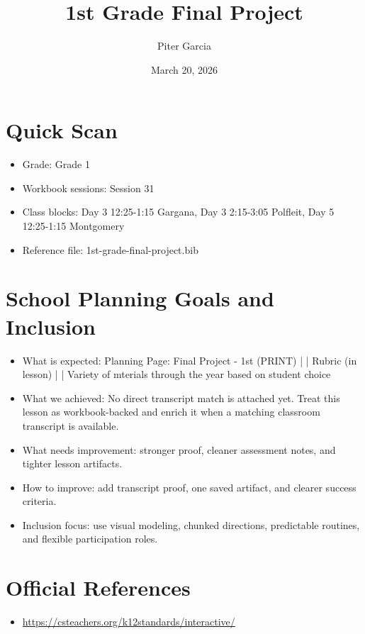 \documentclass[11pt]{article}
\title{1st Grade Final Project}
\author{Piter Garcia}
\date{March 20, 2026}
\begin{document}
\maketitle
\section*{Quick Scan}
\begin{itemize}[leftmargin=*]
\item Grade: Grade 1
\item Workbook sessions: Session 31
\item Class blocks: Day 3 12:25-1:15 Gargana, Day 3 2:15-3:05 Polfleit, Day 5 12:25-1:15 Montgomery
\item Reference file: 1st-grade-final-project.bib
\end{itemize}
\section*{School Planning Goals and Inclusion}
\begin{itemize}[leftmargin=*]
\item What is expected: Planning Page: Final Project - 1st (PRINT) | | Rubric (in lesson) | | Variety of mterials through the year based on student choice
\item What we achieved: No direct transcript match is attached yet. Treat this lesson as workbook-backed and enrich it when a matching classroom transcript is available.
\item What needs improvement: stronger proof, cleaner assessment notes, and tighter lesson artifacts.
\item How to improve: add transcript proof, one saved artifact, and clearer success criteria.
\item Inclusion focus: use visual modeling, chunked directions, predictable routines, and flexible participation roles.
\end{itemize}
\section*{Official References}
\begin{itemize}[leftmargin=*]
\item \url{https://csteachers.org/k12standards/interactive/}

\end{itemize}
\end{document}
